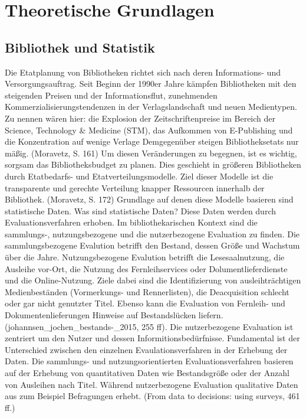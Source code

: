 \chapter{Theoretische Grundlagen}
\label{chap:two}
\section{Bibliothek und Statistik}
\label{chap:two_one}
Die Etatplanung von Bibliotheken richtet sich nach deren Informations- und Versorgungsauftrag. Seit Beginn der 1990er Jahre kämpfen Bibliotheken mit den steigenden Preisen und der Informationsflut, zunehmenden Kommerzialisierungstendenzen in der Verlagslandschaft und neuen Medientypen. Zu nennen wären hier: die Explosion der Zeitschriftenpreise im Bereich der Science, Technology & Medicine (STM), das Aufkommen von E-Publishing und die Konzentration auf wenige Verlage Demgegenüber steigen Bibliotheksetats nur mäßig. (Moravetz, S. 161)
Um diesen Veränderungen zu begegnen, ist es wichtig, sorgsam das Bibliotheksbudget zu planen. Dies geschieht in größeren Bibliotheken durch Etatbedarfs- und Etatverteilungsmodelle. Ziel dieser Modelle ist die transparente und gerechte Verteilung knapper Ressourcen innerhalb der Bibliothek. (Moravetz, S. 172)
Grundlage auf denen diese Modelle basieren sind statistische Daten. Was sind statistische Daten? Diese Daten werden durch Evaluationsverfahren erhoben. Im bibliothekarischen Kontext sind die sammlungs-, nutzungsbezogene und die nutzerbezogene Evaluation zu finden.  Die sammlungsbezogene Evalution betrifft den Bestand, dessen Größe und Wachstum über die Jahre. Nutzungsbezogene Evalution betrifft die Lesesaalnutzung, die Ausleihe vor-Ort, die Nutzung des Fernleihservices oder Dolumentlieferdienste und die Online-Nutzung. Ziele dabei sind die Identifizierung von ausleihträchtigen Medienbeständen (Vormerkungs- und Rennerlisten), die Deacquisition schlecht oder gar nicht genutzter Titel. Ebenso kann die Evaluation von Fernleih- und Dokumentenlieferungen Hinweise auf Bestandslücken liefern. (johannsen_jochen_bestands-_2015, 255 ff). Die nutzerbezogene Evaluation ist zentriert um den Nutzer und dessen Informitionsbedürfnisse.
Fundamental ist der Unterschied zwischen den einzelnen Evaulationsverfahren in der Erhebung der Daten. Die sammlungs- und nutzungsorientierten Evaluationsverfahren basieren auf der Erhebung von quantitativen Daten wie Bestandsgröße oder der Anzahl von Ausleihen nach Titel. Während nutzerbezogene Evaluation qualitative Daten aus zum Beispiel Befragungen erhebt. (From data to decisions: using surveys, 461 ff.)

